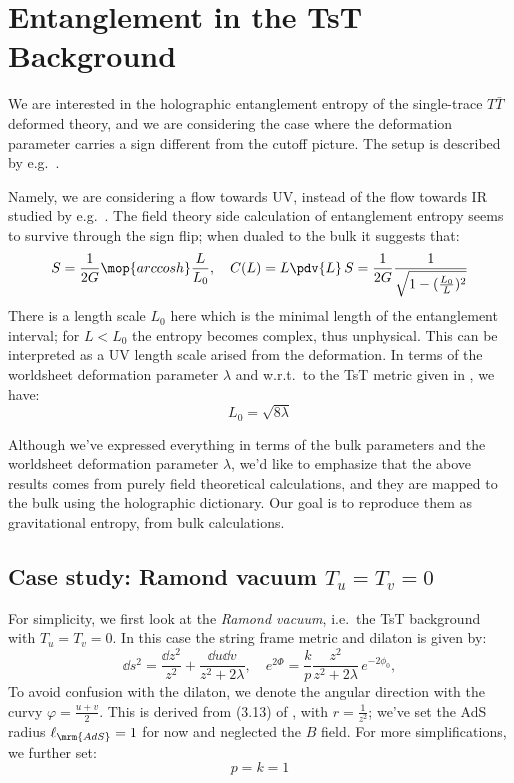 \documentclass[a4paper
	,10pt
]{article}
\begin{document}
\section{Entanglement in the TsT Background}
	We are interested in the holographic entanglement entropy of the single-trace $T\bar{T}$ deformed theory, and we are considering the case where the deformation parameter carries a sign different from the cutoff picture. The setup is described by e.g.~\textcite{Apolo:2019zai,Chakraborty:2018kpr}. 
	
	Namely, we are considering a flow towards UV, instead of the flow towards IR studied by e.g.~\cite{McGough:2016lol,Lewkowycz:2019xse}. 
	The field theory side calculation of entanglement entropy \cite{Donnelly:2018bef,Lewkowycz:2019xse} seems to survive through the sign flip; when dualed to the bulk it suggests that:
	\begin{equation}
		S = \frac{1}{2G} \mop{arccosh}
			\frac{L}{L_0},
	\quad
		C(L) = L \pdv{L}\,S
		= \frac{1}{2G} \frac{1}{
				\sqrt{1 - (\frac{L_0}{L})^2}
			}
	\label{eq:tst_ft_ee}
	\end{equation}
	There is a length scale $L_0$ here which is the minimal length of the entanglement interval; for $L < L_0$ the entropy becomes complex, thus unphysical. This can be interpreted as a UV length scale arised from the deformation. In terms of the worldsheet deformation parameter $\lambda$ and w.r.t.~to the TsT metric given in \cite{Apolo:2019zai}, we have:
	\begin{equation}
		L_0 = \sqrt{8\lambda}
	\end{equation}
	
	Although we've expressed everything in terms of the bulk parameters and the worldsheet deformation parameter $\lambda$, we'd like to emphasize that the above results comes from purely field theoretical calculations, and they are mapped to the bulk using the holographic dictionary. Our goal is to reproduce them as gravitational entropy, from bulk calculations. 
\subsection{Case study: Ramond vacuum $T_u = T_v = 0$}
	For simplicity, we first look at the \textsl{Ramond vacuum}, i.e.~the TsT background with $T_u = T_v = 0$. In this case the string frame metric and dilaton is given by:
	\begin{equation}
		\dd{s}^2
		= \frac{\dd{z}^2}{z^2}
			+ \frac{\dd{u}\dd{v}}{z^2 + 2\lambda},
	\quad
		e^{2\Phi}
		= \frac{k}{p}
			\frac{z^2}{z^2 + 2\lambda}\,
			e^{-2\phi_0},
		\label{eq:staticMetricPoincare}
	\end{equation}
	To avoid confusion with the dilaton, we denote the angular direction with the curvy $\varphi = \frac{u + v}{2}$. 
	This is derived from (3.13) of \cite{Apolo:2019zai}, with $r = \frac{1}{z^2}$; we've set the AdS radius $\ell_{\mrm{AdS}} = 1$ for now and neglected the $B$ field. For more simplifications, we further set:
	\begin{equation}
		p = k = 1
	\end{equation}
\end{document}
